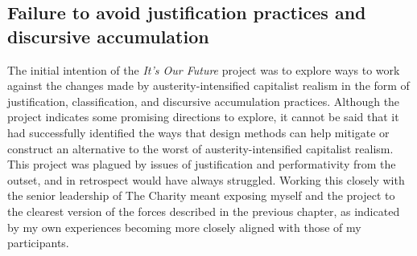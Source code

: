 \subsection{Failure to avoid justification practices and discursive accumulation}
The initial intention of the \textit{It's Our Future} project was to explore ways to work against the changes made by austerity-intensified capitalist realism in the form of justification, classification, and discursive accumulation practices. Although the project indicates some promising directions to explore, it cannot be said that it had successfully identified the ways that design methods can help mitigate or construct an alternative to the worst of austerity-intensified capitalist realism. This project was plagued by issues of justification and performativity from the outset, and in retrospect would have always struggled. Working this closely with the senior leadership of The Charity meant exposing myself and the project to the clearest version of the forces described in the previous chapter, as indicated by my own experiences becoming more closely aligned with those of my participants. 

